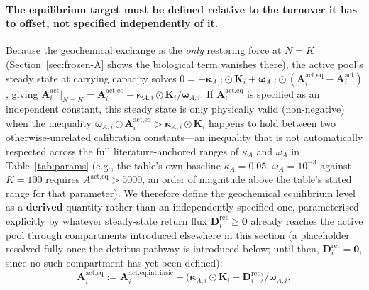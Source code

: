 \documentclass[twocolumn,10pt]{article}
\begin{document}
\paragraph{The equilibrium target must be defined relative to the turnover it has to offset, not specified independently of it.} Because the geochemical exchange is the \emph{only} restoring force at $N=K$ (Section~\ref{sec:frozen-A} shows the biological term vanishes there), the active pool's steady state at carrying capacity solves $0=-\boldsymbol\kappa_{A,i}\odot\mathbf K_i+\boldsymbol\omega_{A,i}\odot(\mathbf A^{\text{act},\text{eq}}_i-\mathbf A^{\text{act}}_i)$, giving $\mathbf A^{\text{act}}_i\big|_{N=K}=\mathbf A^{\text{act},\text{eq}}_i-\boldsymbol\kappa_{A,i}\odot\mathbf K_i/\boldsymbol\omega_{A,i}$. If $\mathbf A^{\text{act},\text{eq}}_i$ is specified as an independent constant, this steady state is only physically valid (non-negative) when the inequality $\boldsymbol\omega_{A,i}\odot\mathbf A^{\text{act},\text{eq}}_i>\boldsymbol\kappa_{A,i}\odot\mathbf K_i$ happens to hold between two otherwise-unrelated calibration constants---an inequality that is not automatically respected across the full literature-anchored ranges of $\kappa_A$ and $\omega_A$ in Table~\ref{tab:params} (e.g., the table's own baseline $\kappa_A=0.05$, $\omega_A=10^{-3}$ against $K=100$ requires $A^{\text{act},\text{eq}}>5000$, an order of magnitude above the table's stated range for that parameter). We therefore define the geochemical equilibrium level as a \textbf{derived} quantity rather than an independently specified one, parameterised explicitly by whatever steady-state return flux $\mathbf D^{\text{ret}}_i\ge\mathbf 0$ already reaches the active pool through compartments introduced elsewhere in this section (a placeholder resolved fully once the detritus pathway is introduced below; until then, $\mathbf D^{\text{ret}}_i=\mathbf 0$, since no such compartment has yet been defined):
\begin{equation}
\mathbf A^{\text{act},\text{eq}}_i := \mathbf A^{\text{act},\text{eq,intrinsic}}_i + \bigl(\boldsymbol\kappa_{A,i}\odot\mathbf K_i - \mathbf D^{\text{ret}}_i\bigr)/\boldsymbol\omega_{A,i},
\label{eq:aeq-derived}
\end{equation}
\end{document}
